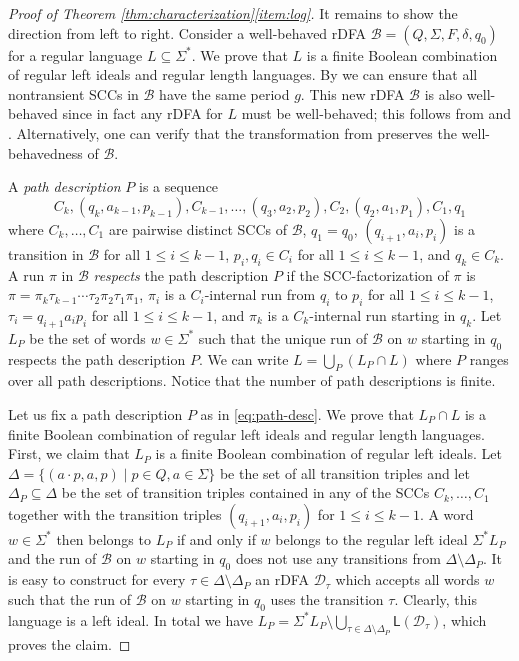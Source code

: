 \documentclass{article}\usepackage[a4paper,margin=20mm]{geometry}
\newcommand{\B}{\mathcal{B}}
\renewcommand{\L}{\mathsf{L}}
\renewcommand{\leq}{\leqslant}
\renewcommand{\le}{\leq}
\begin{document}
\begin{proof}[Proof of Theorem \ref{thm:characterization}\ref{item:log}]
It remains to show the direction from left to right.
Consider a well-behaved rDFA $\B = (Q,\Sigma,F,\delta,q_0)$
for a regular language $L \subseteq \Sigma^*$.
We prove that $L$ is a finite Boolean combination of regular left ideals
and regular length languages.
By  we can ensure that all nontransient SCCs in $\B$
have the same period $g$.
This new rDFA $\B$ is also well-behaved since in fact any rDFA for $L$ must be well-behaved; this follows from 
 and .
Alternatively, one can verify that the transformation from  preserves the well-behavedness of $\B$.

A {\em path description} $P$ is a sequence
\begin{equation}
	\label{eq:path-desc}
	C_k,(q_k,a_{k-1},p_{k-1}),C_{k-1}, \dots ,(q_3,a_2,p_2),C_2,(q_2,a_1,p_1),C_1,q_1
\end{equation}
where $C_k, \dots, C_1$ are pairwise distinct SCCs of $\B$,
$q_1 = q_0$,
$(q_{i+1},a_i,p_i)$ is a transition in $\B$ for all $1 \le i \le k-1$,
$p_i, q_i \in C_i$ for all $1 \le i \le k-1$, and $q_k \in C_k$.
A run $\pi$ in $\B$ {\em respects} the path description $P$ if the SCC-factorization of $\pi$ is
$\pi = \pi_k \tau_{k-1} \cdots \tau_2 \pi_2 \tau_1 \pi_1$,
$\pi_i$ is a $C_i$-internal run from $q_i$ to $p_i$ for all $1 \le i \le k-1$,
$\tau_i = q_{i+1} a_i p_i$ for all $1 \le i \le k-1$,
and $\pi_k$ is a $C_k$-internal run starting in $q_k$.
Let $L_P$ be the set of words $w \in \Sigma^*$ such that the unique run of $\B$ on $w$
starting in $q_0$ respects the path description $P$.
We can write $L = \bigcup_P (L_P \cap L)$ where $P$ ranges over all path descriptions.
Notice that the number of path descriptions is finite.

Let us fix a path description $P$ as in \eqref{eq:path-desc}. We prove that $L_P \cap L$ is a finite Boolean combination of regular left ideals and regular length languages.
First, we claim that $L_P$ is a finite Boolean combination of regular left ideals.
Let $\Delta = \{ (a \cdot p,a,p) \mid p \in Q, a \in \Sigma \}$ be the set of all transition triples
and let $\Delta_P \subseteq \Delta$ be the set of transition triples contained in any of the SCCs $C_k, \dots, C_1$
together with the transition triples $(q_{i+1},a_i,p_i)$ for $1 \le i \le k-1$.
A word $w \in \Sigma^*$ then belongs to $L_P$ if and only if
$w$ belongs to the regular left ideal $\Sigma^* L_P$ and the run of $\B$ on $w$ starting in $q_0$
does not use any transitions from $\Delta \setminus \Delta_P$.
It is easy to construct for every  $\tau \in \Delta \setminus \Delta_P$
an rDFA $\mathcal{D}_\tau$ which accepts all words $w$ such that the run of $\B$ on $w$ starting in $q_0$
uses the transition $\tau$. Clearly, this language is a left ideal.
In total we have $L_P = \Sigma^* L_P \setminus \bigcup_{\tau \in \Delta \setminus \Delta_P} \L(\mathcal{D}_\tau)$,
which proves the claim.


\end{proof}
\end{document}
